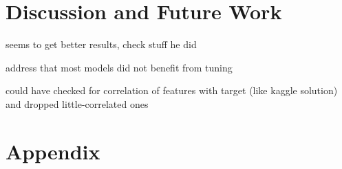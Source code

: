 \documentclass[a4paper,12pt]{article}
\begin{document}
\section{Discussion and Future Work}

seems to get better results, check stuff he did

address that most models did not benefit from tuning

could have checked for correlation of features with target (like kaggle solution) and dropped little-correlated ones

\clearpage

\appendix
\section*{Appendix}
\end{document}
